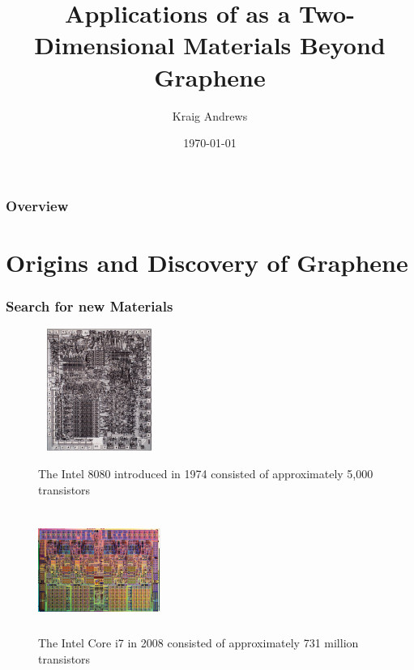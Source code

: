\documentclass{beamer}
\title[2D Materials Beyond Graphene]{Applications of \ch{MoS2} as a Two-Dimensional Materials Beyond Graphene} %
\author{Kraig Andrews} %
\institute[Wayne State University] %
{
Wayne State University \\ %
\medskip
\textit{kraig.andrews@wayne.edu} %
}
\date{\today} %
\begin{document}
\begin{frame}
\titlepage %
\end{frame}

\begin{frame}
\frametitle{Overview} 
\tableofcontents 
\end{frame}

\section{Origins and Discovery of Graphene}

\begin{frame}
\frametitle{Search for new Materials}
\begin{figure}
	\centering
	\begin{minipage}{0.45\textwidth}
		\centering
		\includegraphics[height=4cm,width=4cm]{../present_figs/intel1974}
		\caption{The Intel 8080 introduced in 1974 consisted of approximately 5,000 transistors}
	\end{minipage}\hfill
	\begin{minipage}{0.45\textwidth}
		\centering
		\includegraphics[height=4cm,width=4cm]{../present_figs/i7chip}
		\caption{The Intel Core i7 in 2008 consisted of approximately 731 million transistors}
	\end{minipage}
\end{figure}
\cite{Grifantini2008}
\end{frame}
\end{document}
